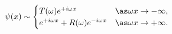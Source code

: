 \begin{equation}
\psi(x) \sim \begin{cases}
T(\omega) e^{+i \omega x}  \label{transmission-boundary-complex} & \as \omega x \to -\infty, \\
e^{+i \omega x} + R(\omega) e^{-i \omega x} & \as \omega x \to +\infty. 
\end{cases}
\end{equation}

